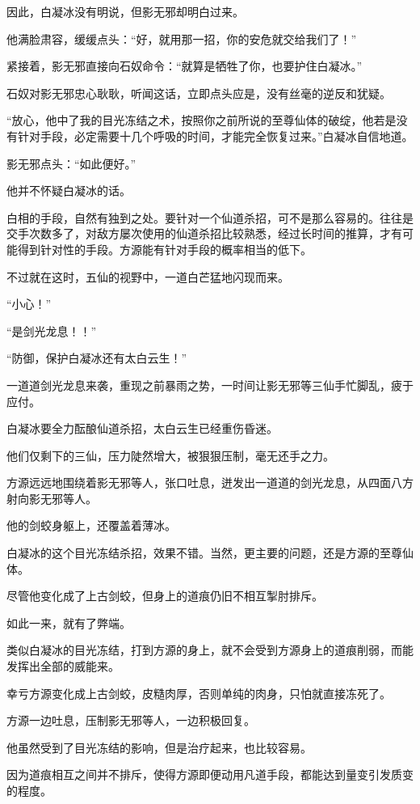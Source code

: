 \begin{this_body}
因此，白凝冰没有明说，但影无邪却明白过来。

他满脸肃容，缓缓点头：“好，就用那一招，你的安危就交给我们了！”

紧接着，影无邪直接向石奴命令：“就算是牺牲了你，也要护住白凝冰。”

石奴对影无邪忠心耿耿，听闻这话，立即点头应是，没有丝毫的逆反和犹疑。

“放心，他中了我的目光冻结之术，按照你之前所说的至尊仙体的破绽，他若是没有针对手段，必定需要十几个呼吸的时间，才能完全恢复过来。”白凝冰自信地道。

影无邪点头：“如此便好。”

他并不怀疑白凝冰的话。

白相的手段，自然有独到之处。要针对一个仙道杀招，可不是那么容易的。往往是交手次数多了，对敌方屡次使用的仙道杀招比较熟悉，经过长时间的推算，才有可能得到针对性的手段。方源能有针对手段的概率相当的低下。

不过就在这时，五仙的视野中，一道白芒猛地闪现而来。

“小心！”

“是剑光龙息！！”

“防御，保护白凝冰还有太白云生！”

一道道剑光龙息来袭，重现之前暴雨之势，一时间让影无邪等三仙手忙脚乱，疲于应付。

白凝冰要全力酝酿仙道杀招，太白云生已经重伤昏迷。

他们仅剩下的三仙，压力陡然增大，被狠狠压制，毫无还手之力。

方源远远地围绕着影无邪等人，张口吐息，迸发出一道道的剑光龙息，从四面八方射向影无邪等人。

他的剑蛟身躯上，还覆盖着薄冰。

白凝冰的这个目光冻结杀招，效果不错。当然，更主要的问题，还是方源的至尊仙体。

尽管他变化成了上古剑蛟，但身上的道痕仍旧不相互掣肘排斥。

如此一来，就有了弊端。

类似白凝冰的目光冻结，打到方源的身上，就不会受到方源身上的道痕削弱，而能发挥出全部的威能来。

幸亏方源变化成上古剑蛟，皮糙肉厚，否则单纯的肉身，只怕就直接冻死了。

方源一边吐息，压制影无邪等人，一边积极回复。

他虽然受到了目光冻结的影响，但是治疗起来，也比较容易。

因为道痕相互之间并不排斥，使得方源即便动用凡道手段，都能达到量变引发质变的程度。


\end{this_body}
